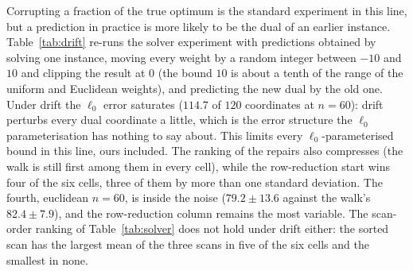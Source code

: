 Corrupting a fraction of the true optimum is the standard experiment in this line, but a
prediction in practice is more likely to be the dual of an earlier instance. Table~\ref{tab:drift} re-runs the solver
experiment with predictions obtained by solving one instance, moving every weight by a random
integer between $-10$ and $10$ and clipping the result at $0$ (the bound $10$ is about a tenth of the
range of the uniform and Euclidean weights), and predicting the new dual by the old one. Under drift the $\ell_0$ error saturates
($114.7$ of $120$ coordinates at $n = 60$): drift perturbs every dual coordinate a little, which is
the error structure the $\ell_0$ parameterisation has nothing to say about. This limits every
$\ell_0$-parameterised bound in this line, ours included. The ranking of
the repairs also compresses (the walk is still first among them in every cell), while the
row-reduction start wins four of the six cells, three of them by more than one standard deviation.
The fourth, euclidean $n = 60$, is inside the noise ($79.2 \pm 13.6$ against the walk's
$82.4 \pm 7.9$), and the row-reduction column remains the most variable. The scan-order ranking of
Table~\ref{tab:solver} does not hold under drift either: the sorted scan has the largest mean of the
three scans in five of the six cells and the smallest in none.

